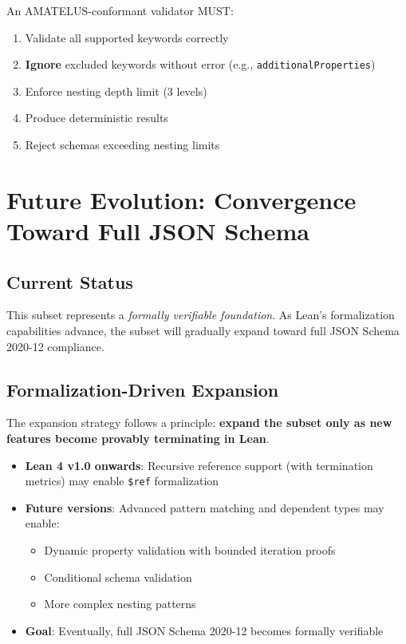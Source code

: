 An AMATELUS-conformant validator MUST:

\begin{enumerate}
  \item Validate all supported keywords correctly
  \item \textbf{Ignore} excluded keywords without error (e.g., \texttt{additionalProperties})
  \item Enforce nesting depth limit (3 levels)
  \item Produce deterministic results
  \item Reject schemas exceeding nesting limits
\end{enumerate}

\section{Future Evolution: Convergence Toward Full JSON Schema}

\subsection{Current Status}

This subset represents a \emph{formally verifiable foundation}. As Lean's formalization capabilities advance, the subset will gradually expand toward full JSON Schema 2020-12 compliance.

\subsection{Formalization-Driven Expansion}

The expansion strategy follows a principle: \textbf{expand the subset only as new features become provably terminating in Lean}.

\begin{itemize}
  \item \textbf{Lean 4 v1.0 onwards}: Recursive reference support (with termination metrics) may enable \texttt{\$ref} formalization
  \item \textbf{Future versions}: Advanced pattern matching and dependent types may enable:
    \begin{itemize}
      \item Dynamic property validation with bounded iteration proofs
      \item Conditional schema validation
      \item More complex nesting patterns
    \end{itemize}
  \item \textbf{Goal}: Eventually, full JSON Schema 2020-12 becomes formally verifiable
\end{itemize}

